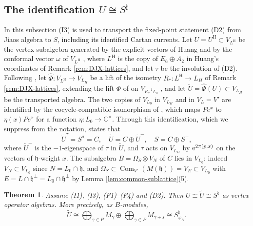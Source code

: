 \documentclass[leqno]{article}
\newcommand{\Cbb}{\ensuremath{\mathbb{C}}}
\newcommand{\co}{\colon}
\newcommand{\ot}{\otimes}
\let\i\relax
\newcommand{\i}{\mathrm{i}}
\newcommand{\e}{\mathrm{e}}
\newtheorem{thm}{Theorem}[section]
\numberwithin{equation}{section}
\begin{document}
\subsection{The identification \texorpdfstring{$U \cong S^\natural$}{U = twin of S}}
\label{subsec:identification}

In this subsection (I3) is used to transport the fixed-point statement (D2) from Jiao\textquotesingle s algebra to $S$, including its identified Cartan currents. Let $U = U^{\mathrm H} \subset V_{L^{\mathrm H}}$ be the vertex subalgebra generated by the explicit vectors of Huang and by the conformal vector $\omega$ of $V_{L^{\mathrm H}}$ \cite[(4.6)--(4.9)]{DJX26}, where $L^{\mathrm H}$ is the copy of $E_6 \oplus A_2$ in Huang's coordinates of Remark \ref{rem:DJX-lattices}, and let $\tau$ be the involution of \textup{(D2)}. Following \cite[Sections 5--7]{DJX26}, let $\hat\Phi \co V_{L^{\mathrm H}} \to V_{L_H}$ be a lift of the isometry $R_* \co L^{\mathrm H} \to L_H$ of Remark \ref{rem:DJX-lattices}, extending the lift $\Phi$ of \cite[(6.13)]{DJX26} on $V_{R_*^{-1}L_0}$ \cite[p.~21]{DJX26}, and let $\tilde U = \hat\Phi(U) \subset V_{L_H}$ be the transported algebra. The two copies of $V_{L_0}$ in $V_{L_H}$ and in $V_L = V'$ are identified by the cocycle-compatible isomorphism of \cite[(5.7)]{DJX26}, which maps $P e^x$ to $\eta(x)Pe^x$ for a function $\eta \co L_0 \to \Cbb^\times$. Through this identification, which we suppress from the notation, \cite[Theorem 7.3]{DJX26} states that
\begin{equation}
\label{eq:DJX-fixed-point}
\tilde U^\tau = S^\sigma = C,
\quad
\tilde U = C \oplus \tilde U^-,
\quad
S = C \oplus S^-,
\end{equation}
where $\tilde U^-$ is the $-1$-eigenspace of $\tau$ in $\tilde U$, and $\tau$ acts on $V_{L_H}$ by $\e^{2\pi\i(p,x)}$ on the vectors of $\mathfrak h$-weight $x$. The subalgebra $B = \Omega_S \ot V_N$ of $C$ lies in $V_{L_0}$: indeed $V_N \subset V_{L_0}$ since $N = L_0 \cap \mathfrak h$, and $\Omega_S \subset \operatorname{Com}_{V'}(M(\mathfrak h)) = V_E \subset V_{L_0}$ with $E = L \cap \mathfrak h^\perp = L_0 \cap \mathfrak h^\perp$ by Lemma \ref{lem:common-sublattice}(5).

\begin{thm}
\label{thm:identification}
Assume \textup{(I1)}, \textup{(I3)}, \textup{(F1)}--\textup{(F4)} and \textup{(D2)}. Then $U \cong \tilde U \cong S^\natural$ as vertex operator algebras. More precisely, as $B$-modules,
\[
\tilde U \cong \bigoplus_{\gamma \in P} M_\gamma \oplus \bigoplus_{\gamma \in P} M_{\gamma+s} \cong S^\natural_{\psi_N}.
\]
\end{thm}
\end{document}
